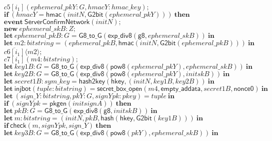 \documentclass{article}
\newcommand{\cinput}[2]{{#1}({#2})}
\newcommand{\coutput}[2]{\overline{#1}\langle{#2}\rangle}
\newcommand{\kw}[1]{\mathbf{#1}}
\newcommand{\kwf}[1]{\mathsf{#1}}
\newcommand{\var}[1]{\mathit{#1}}
\newcommand{\kwt}[1]{\mathit{#1}}
\newcommand{\kwc}[1]{\mathit{#1}}
\begin{document}
\begin{tabbing}
\>$\quad \cinput{\kwc{c5}[\var{i}_{1}]}{\var{ephemeral{\_}pkY}: \kwt{G}, \var{hmacY}: \kwt{hmac{\_}key}};$\\
\>$\quad \kw{if}\ (\var{hmacY}  =  \kwf{hmac}(\var{initN}, \kwf{G2bit}(\var{ephemeral{\_}pkY})))\ \kw{then}$\\
\>$\quad \kw{event}\ \kwf{ServerConfirmNetwork}(\var{initN});$\\
\>$\quad \kw{new}\ \var{ephemeral{\_}skB}: \kwt{Z};$\\
\>$\quad \kw{let}\ \var{ephemeral{\_}pkB}: \kwt{G} = \kwf{G8{\_}to{\_}G}(\kwf{exp{\_}div8}(\kwf{g8}, \var{ephemeral{\_}skB}))\ \kw{in}$\\
\>$\quad \kw{let}\ \var{m2}: \kwt{bitstring} = \kwf{}(\var{ephemeral{\_}pkB}, \kwf{hmac}(\var{initN}, \kwf{G2bit}(\var{ephemeral{\_}pkB})))\ \kw{in}$\\
\>$\quad \coutput{\kwc{c6}[\var{i}_{1}]}{\var{m2}};$\\
\>$\quad \cinput{\kwc{c7}[\var{i}_{1}]}{\var{m4}: \kwt{bitstring}};$\\
\>$\quad \kw{let}\ \var{key1B}: \kwt{G} = \kwf{G8{\_}to{\_}G}(\kwf{exp{\_}div8}(\kwf{pow8}(\var{ephemeral{\_}pkY}), \var{ephemeral{\_}skB}))\ \kw{in}$\\
\>$\quad \kw{let}\ \var{key2B}: \kwt{G} = \kwf{G8{\_}to{\_}G}(\kwf{exp{\_}div8}(\kwf{pow8}(\var{ephemeral{\_}pkY}), \var{initskB}))\ \kw{in}$\\
\>$\quad \kw{let}\ \var{secret1B}: \kwt{sym{\_}key} = \kwf{hash2key}(\kwf{hkey}, \kwf{}(\var{initN}, \var{key1B}, \var{key2B}))\ \kw{in}$\\
\>$\quad \kw{let}\ \kwf{injbot}(\var{tuple}: \kwt{bitstring}) = \kwf{secret{\_}box{\_}open}(\var{m4}, \kwf{empty{\_}addata}, \var{secret1B}, \kwf{nonce0})\ \kw{in}$\\
\>$\quad \kw{let}\ \kwf{}(\var{sign{\_}Y}: \kwt{bitstring}, \var{pkY}: \kwt{G}, \var{signYpk}: \kwt{pkey}) = \var{tuple}\ \kw{in}$\\
\>$\quad \kw{if}\ (\var{signYpk}  =  \kwf{pkgen}(\var{initsignA}))\ \kw{then}$\\
\>$\quad \kw{let}\ \var{pkB}: \kwt{G} = \kwf{G8{\_}to{\_}G}(\kwf{exp{\_}div8}(\kwf{g8}, \var{initskB}))\ \kw{in}$\\
\>$\quad \kw{let}\ \var{m}: \kwt{bitstring} = \kwf{}(\var{initN}, \var{pkB}, \kwf{hash}(\kwf{hkey}, \kwf{G2bit}(\var{key1B})))\ \kw{in}$\\
\>$\quad \kw{if}\ \kwf{check}(\var{m}, \var{signYpk}, \var{sign{\_}Y})\ \kw{then}$\\
\>$\quad \kw{let}\ \var{key3B}: \kwt{G} = \kwf{G8{\_}to{\_}G}(\kwf{exp{\_}div8}(\kwf{pow8}(\var{pkY}), \var{ephemeral{\_}skB}))\ \kw{in}$\\

\end{tabbing}
\end{document}

